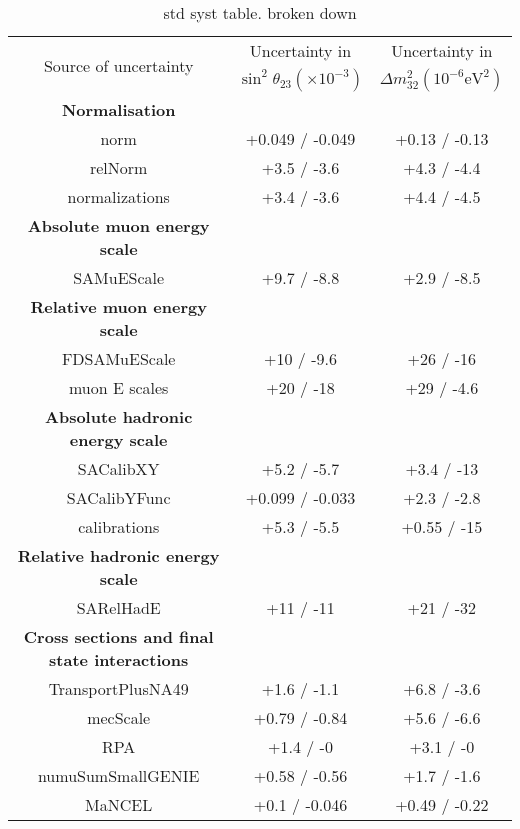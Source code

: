 \begin{table*}[t]
  \centering
  \caption{
    std syst table. broken down
  }
  \begin{tabular}{c c c}
    \hline 
    \multirow{2}{*}{Source of uncertainty} & Uncertainty in & Uncertainty in \\
                                           & $\sin^2\!\theta_{23}
                                             (\times 10^{-3})$ &
                                                                 $\Delta
                                                                 m^2_{32}
                                                                 \left(10^{-6}\text{
                                                                 eV}^{2}\right)$
    \\
    \hline 
    \textbf{Normalisation} & & \\
    norm& +0.049 / -0.049& +0.13 / -0.13 \\
    relNorm& +3.5 / -3.6& +4.3 / -4.4 \\
    normalizations& +3.4 / -3.6& +4.4 / -4.5 \\
    \hline
    \textbf{Absolute muon energy scale} & & \\
    SAMuEScale& +9.7 / -8.8& +2.9 / -8.5 \\
    \textbf{Relative muon energy scale} & & \\
    FDSAMuEScale& +10 / -9.6& +26 / -16 \\
    muon E scales& +20 / -18& +29 / -4.6 \\
    \textbf{Absolute hadronic energy scale} & & \\
    SACalibXY& +5.2 / -5.7& +3.4 / -13 \\
    SACalibYFunc& +0.099 / -0.033& +2.3 / -2.8 \\
    calibrations& +5.3 / -5.5& +0.55 / -15 \\
    \textbf{Relative hadronic energy scale} & & \\
    SARelHadE& +11 / -11& +21 / -32 \\
    \hline
    \textbf{Cross sections and final state interactions} & & \\
    TransportPlusNA49& +1.6 / -1.1& +6.8 / -3.6 \\
    mecScale& +0.79 / -0.84& +5.6 / -6.6 \\
    RPA& +1.4 / -0& +3.1 / -0 \\
    numuSumSmallGENIE& +0.58 / -0.56& +1.7 / -1.6 \\
    MaNCEL& +0.1 / -0.046& +0.49 / -0.22 \\

\end{tabular}
\end{table*}
